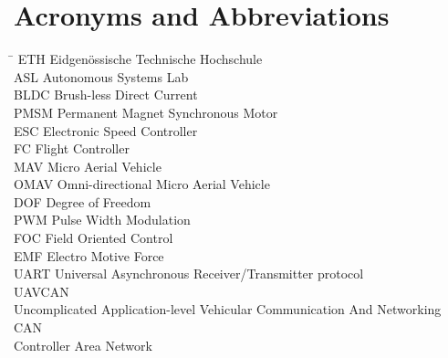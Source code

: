 \section*{Acronyms and Abbreviations}
\begin{tabbing}
 \hspace*{1.6cm}  \= \kill
 ETH \> Eidgenössische Technische Hochschule \\[0.5ex]
 ASL \> Autonomous Systems Lab \\[0.5ex]
 BLDC \> Brush-less Direct Current \\[0.5ex]
 PMSM \> Permanent Magnet Synchronous Motor \\[0.5ex]
 ESC \> Electronic Speed Controller \\[0.5ex]
 FC \> Flight Controller\\[0.5ex]
 MAV \> Micro Aerial Vehicle \\[0.5ex]
 OMAV \> Omni-directional Micro Aerial Vehicle\\[0.5ex]
 DOF \> Degree of Freedom\\[0.5ex] 
 PWM \> Pulse Width Modulation\\[0.5ex]
 FOC \> Field Oriented Control \\[0.5ex]
 EMF \> Electro Motive Force \\[0.5ex]
 UART \> Universal Asynchronous Receiver/Transmitter protocol \\[0.5ex]
 UAVCAN \\  Uncomplicated Application-level Vehicular Communication And Networking\\[0.5ex]
CAN \\	Controller Area Network\\ [0.5ex]
 \end{tabbing}